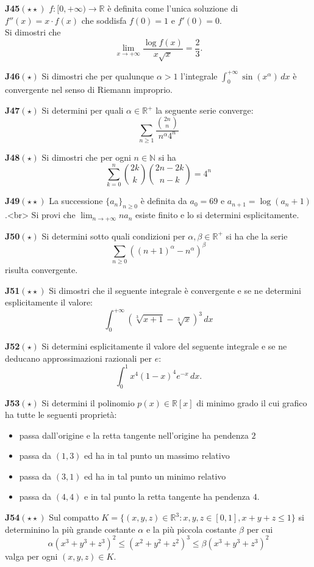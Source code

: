 \documentclass[a4paper,twoside]{article}
\theoremstyle{definition}
\numberwithin{theorem}{section}
\begin{document}
\textbf{J45}$(\star\star)$ $f:[0,+\infty)\to\mathbb{R}$ è definita come l'unica soluzione di $f''(x)=x\cdot f(x)$ che soddisfa $f(0)=1$ e $f'(0)=0$.\\ Si dimostri che 
$$ \lim_{x\to +\infty}\frac{\log f(x)}{x\sqrt{x}} = \frac{2}{3}.$$

\textbf{J46}$(\star)$ Si dimostri che per qualunque $\alpha > 1$ l'integrale $\int_{0}^{+\infty}\sin(x^\alpha)\,dx $ è convergente nel senso di Riemann improprio.

\textbf{J47}$(\star)$ Si determini per quali $\alpha\in\mathbb{R}^+$ la seguente serie converge:
$$ \sum_{n\geq 1}\frac{\binom{2n}{n}}{n^\alpha 4^n} $$

\textbf{J48}$(\star)$ Si dimostri che per ogni $n\in\mathbb{N}$ si ha
$$ \sum_{k=0}^{n}\binom{2k}{k}\binom{2n-2k}{n-k} = 4^n $$

\textbf{J49}$(\star\star)$ La successione $\{a_n\}_{n\geq 0}$ è definita da $a_0=69$ e $a_{n+1}=\log(a_n+1)$.<br> Si provi che $\lim_{n\to +\infty} na_n$ esiste finito e lo si determini esplicitamente. 

\textbf{J50}$(\star)$ Si determini sotto quali condizioni per $\alpha,\beta\in\mathbb{R}^+$ si ha che la serie
$$ \sum_{n\geq 0}\left((n+1)^\alpha-n^\alpha\right)^\beta $$
risulta convergente.

\textbf{J51}$(\star\star)$ Si dimostri che il seguente integrale è convergente e se ne determini esplicitamente il valore:
$$ \int_{0}^{+\infty}\left(\sqrt[3]{x+1}-\sqrt[3]{x}\right)^3\,dx $$

\textbf{J52}$(\star)$ Si determini esplicitamente il valore del seguente integrale e se ne deducano approssimazioni razionali per $e$: $$\int_{0}^{1}x^4(1-x)^4 e^{-x}\,dx. $$

\textbf{J53}$(\star)$ Si determini il polinomio $p(x)\in\mathbb{R}[x]$ di minimo grado il cui grafico ha tutte le seguenti proprietà:
\begin{itemize}
\item passa dall'origine e la retta tangente nell'origine ha pendenza $2$
\item passa da $(1,3)$ ed ha in tal punto un massimo relativo
\item passa da $(3,1)$ ed ha in tal punto un minimo relativo
\item passa da $(4,4)$ e in tal punto la retta tangente ha pendenza $4$.
\end{itemize}
\textbf{J54}$(\star\star)$ Sul compatto $K=\{(x,y,z)\in\mathbb{R}^3: x,y,z\in[0,1], x+y+z\leq 1\}$ si determinino la più grande costante $\alpha$ e la più piccola costante $\beta$ per cui
$$\alpha (x^3+y^3+z^3)^2\leq  (x^2+y^2+z^2)^3 \leq \beta (x^3+y^3+z^3)^2$$
valga per ogni $(x,y,z)\in K$.
\end{document}
